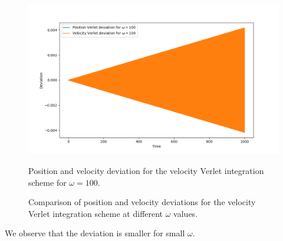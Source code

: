 \begin{figure}[h!]
    \vspace{1em}
    \begin{minipage}{0.45\textwidth}
        \centering
        \includegraphics[width=\textwidth]{FIG/ex9/stability_comparison_2.png}
        \caption{Position and velocity deviation for the velocity Verlet integration scheme for $\omega=100$.}
        \label{fig:stability_comparison_2}
    \end{minipage}
    
    \caption{Comparison of position and velocity deviations for the velocity Verlet integration scheme at different $\omega$ values.}
    \label{fig:stability_comparison}
\end{figure}

We observe that the deviation is smaller for small $\omega$.